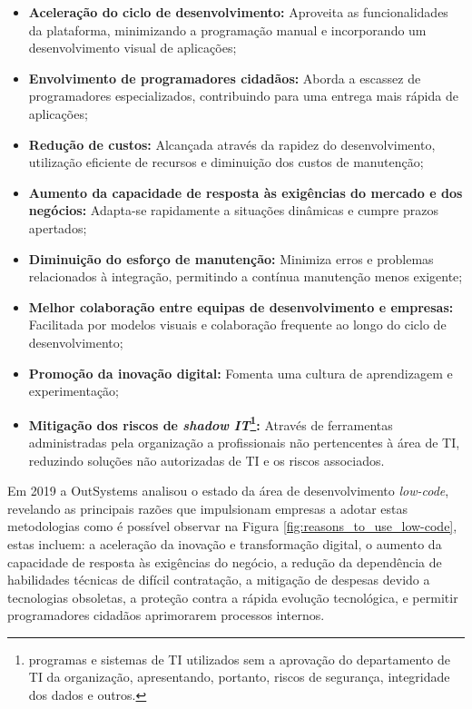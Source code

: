             \begin{itemize}
                \item \textbf{Aceleração do ciclo de desenvolvimento:} Aproveita as funcionalidades da plataforma, minimizando a programação manual e incorporando um desenvolvimento visual de aplicações;
                \item \textbf{Envolvimento de programadores cidadãos:} Aborda a escassez de programadores especializados, contribuindo para uma entrega mais rápida de aplicações;
                \item \textbf{Redução de custos:} Alcançada através da rapidez do desenvolvimento, utilização eficiente de recursos e diminuição dos custos de manutenção;
                \item \textbf{Aumento da capacidade de resposta às exigências do mercado e dos negócios:} Adapta-se rapidamente a situações dinâmicas e cumpre prazos apertados;
                \item \textbf{Diminuição do esforço de manutenção:} Minimiza erros e problemas relacionados à integração, permitindo a contínua manutenção menos exigente;
                \item \textbf{Melhor colaboração entre equipas de desenvolvimento e empresas:} Facilitada por modelos visuais e colaboração frequente ao longo do ciclo de desenvolvimento;
                \item \textbf{Promoção da inovação digital:} Fomenta uma cultura de aprendizagem e experimentação;
                \item \textbf{Mitigação dos riscos de \textit{shadow IT}\footnote{programas e sistemas de TI utilizados sem a aprovação do departamento de TI da organização, apresentando, portanto, riscos de segurança, integridade dos dados e outros.}:} Através de ferramentas administradas pela organização a profissionais não pertencentes à área 
                de TI, reduzindo soluções não autorizadas de TI e os riscos associados\cite{rokis2023exploring}.
            \end{itemize}

            Em 2019 a OutSystems analisou o estado da área de desenvolvimento \textit{low-code}, revelando as principais razões que impulsionam empresas a adotar estas metodologias como é possível observar na Figura \ref{fig:reasons_to_use_low-code}, estas incluem: a aceleração da inovação e transformação digital, o aumento da capacidade de resposta às exigências do negócio, a redução da dependência de habilidades técnicas de difícil contratação, a mitigação de despesas devido a tecnologias obsoletas, a proteção contra a rápida evolução tecnológica, e permitir programadores cidadãos aprimorarem processos internos.
    
